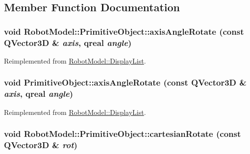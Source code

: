 \subsection{Member Function Documentation}
\hypertarget{class_robot_model_1_1_primitive_object_ae57db819937782138821a30960a72aa0}{
\subsubsection[{axisAngleRotate}]{\setlength{\rightskip}{0pt plus 5cm}void RobotModel::PrimitiveObject::axisAngleRotate (const QVector3D \& {\em axis}, \/  qreal {\em angle})}}
\label{class_robot_model_1_1_primitive_object_ae57db819937782138821a30960a72aa0}


Reimplemented from \hyperlink{class_robot_model_1_1_display_list_a9a7084168997ac285ee1e9f4041a8d57}{RobotModel::DisplayList}.\hypertarget{class_robot_model_1_1_primitive_object_a97b449302680b96410ff7296c794f640}{
\subsubsection[{axisAngleRotate}]{\setlength{\rightskip}{0pt plus 5cm}void PrimitiveObject::axisAngleRotate (const QVector3D \& {\em axis}, \/  qreal {\em angle})}}
\label{class_robot_model_1_1_primitive_object_a97b449302680b96410ff7296c794f640}


Reimplemented from \hyperlink{class_robot_model_1_1_display_list_a9a7084168997ac285ee1e9f4041a8d57}{RobotModel::DisplayList}.\hypertarget{class_robot_model_1_1_primitive_object_aa490f6642a6a02d48cf8ed9cd49a47f7}{
\subsubsection[{cartesianRotate}]{\setlength{\rightskip}{0pt plus 5cm}void RobotModel::PrimitiveObject::cartesianRotate (const QVector3D \& {\em rot})}}
\label{class_robot_model_1_1_primitive_object_aa490f6642a6a02d48cf8ed9cd49a47f7}


